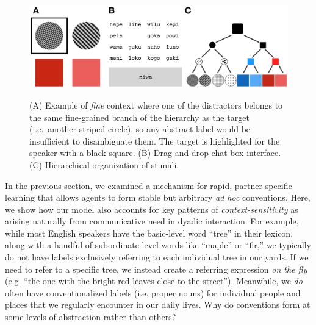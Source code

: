 
\begin{figure}[t]
\begin{center}
{\includegraphics[scale=.63]{./figures/Sec2-design.png}}
{\caption{{(A) Example of \emph{fine} context where one of the distractors belongs to the same fine-grained branch of the hierarchy as the target (i.e.\ another striped circle), so any abstract label would be insufficient to disambiguate them. The target is highlighted for the speaker with a black square. (B) Drag-and-drop chat box interface. (C) Hierarchical organization of stimuli.\label{fig:context_design}}}}
\vspace{-2ex}
\end{center}
\end{figure}

In the previous section, we examined a mechanism for rapid, partner-specific learning that allows agents to form stable but arbitrary \emph{ad hoc} conventions. 
Here, we show how our model also accounts for key patterns of \emph{context-sensitivity} as arising naturally from communicative need in dyadic interaction.
For example, while most English speakers have the basic-level word ``tree'' in their lexicon, along with a handful of subordinate-level words like ``maple'' or ``fir,'' we typically do not have labels exclusively referring to each individual tree in our yards.
If we need to refer to a specific tree, we instead create a referring expression \emph{on the fly} (e.g. ``the one with the bright red leaves close to the street'').
Meanwhile, we \emph{do} often have conventionalized labels (i.e. proper nouns) for individual people and places that we regularly encounter in our daily lives.
Why do conventions form at some levels of abstraction rather than others?


